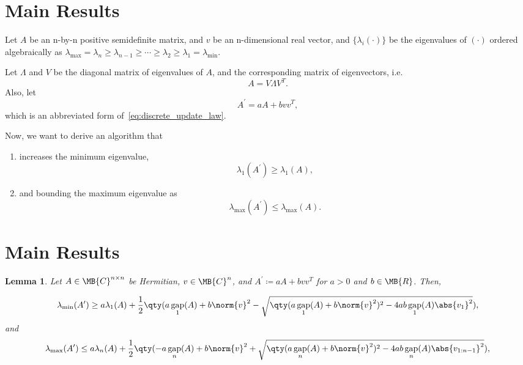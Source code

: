 \documentclass[nobib]{my-handout}
\newtheorem{lemma}{Lemma}
\theoremstyle{definition}
\theoremstyle{remark}
\DeclareMathOperator{\gap}{gap}
\begin{document}
\section{Main Results}

Let $A$ be an n-by-n positive semidefinite matrix, and $v$ be an
n-dimensional real vector, and $\{\lambda_i(\cdot)\}$ be the eigenvalues
of $(\cdot)$ ordered algebraically as $\lambda_{\max} = \lambda_n \ge
\lambda_{n-1} \ge \cdots \ge \lambda_2 \ge \lambda_1 = \lambda_{\min}$.

Let $\Lambda$ and $V$ be the diagonal matrix of eigenvalues of $A$, and the
corresponding matrix of eigenvectors, i.e.
\begin{equation*}
	A = V \Lambda V^T.
\end{equation*}
Also, let
\begin{equation*}
	A^\prime = a A + b v v^T,
\end{equation*}
which is an abbreviated form of~\eqref{eq:discrete_update_law}.
	
Now, we want to derive an algorithm that
\begin{enumerate}
	\item increases the minimum eigenvalue,
		\begin{equation*}
			\lambda_1 (A^\prime) \ge \lambda_1 (A),
		\end{equation*}
	\item and bounding the maximum eigenvalue as
		\begin{equation*}
			\lambda_{\max}(A^\prime) \le \lambda_{\max}(A).
		\end{equation*}
\end{enumerate}


\section{Main Results}

\begin{lemma}\label{lem:ipsen_eigenvalue_bounds}
	Let $A \in \MB{C}^{n \times n}$ be Hermitian, $v \in \MB{C}^n$, and $A^\prime
	\coloneqq a A + b v v^T$ for $a > 0$ and $ b \in \MB{R}$. Then,
	\begin{fullwidth}
		\begin{equation}
			\lambda_{\min}(A^\prime)
			\ge a \lambda_1(A) + \frac{1}{2} \qty(a \gap_1(A) + b \norm{v}^2 -
			\sqrt{\qty(a \gap_1(A) + b \norm{v}^2)^2 - 4 a b \gap_1(A) \abs{v_1}^2}),
		\end{equation}
		and
		\begin{equation}
			\lambda_{\max}(A^\prime)
			\le a \lambda_n(A) + \frac{1}{2} \qty(- a \gap_n(A) + b \norm{v}^2 
			+ \sqrt{\qty(a \gap_n(A) + b \norm{v}^2)^2 - 4 a b \gap_n(A)
			\abs{v_{1:n-1}}^2}),
		\end{equation}
	\end{fullwidth}
	\end{lemma}
\end{document}
